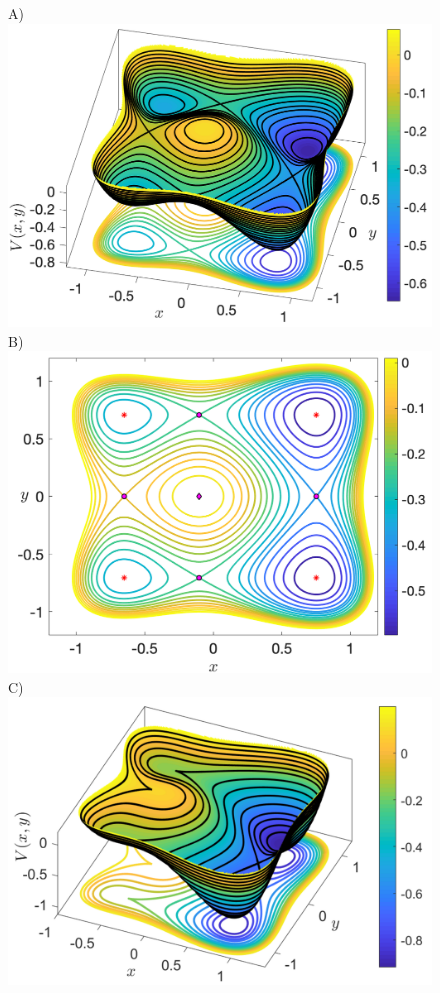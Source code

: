\documentclass[10pt,aps,onecolumn,superscriptaddress]{revtex4-2}
\begin{document}
\begin{figure}[htbp]
	\begin{center}
		A)\includegraphics[scale=0.2]{surface_potential_a_1_b_0_g_0_d_02_big.png}
		B)\includegraphics[scale=0.19]{surface_potential_a_1_b_0_g_0_d_02_plane_big.png}
		C)\includegraphics[scale=0.3]{pes_asymm_bif_nocoup.pdf}

\end{center}
\end{figure}
\end{document}
